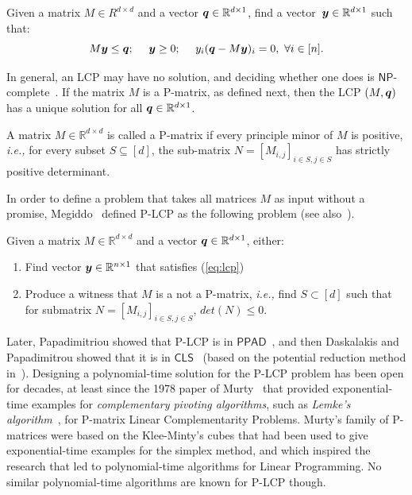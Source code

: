 \documentclass[a4paper,UKenglish]{lipics2}
\theoremstyle{definition}
\def\cc#1{\mathsf{#1}}
\def\CLS{\ensuremath{\cc{CLS}}\xspace}
\def\NP{\ensuremath{\cc{NP}}\xspace}
\def\PPAD{\ensuremath{\cc{PPAD}}\xspace}
\def\problem#1{\textsc{#1}}
\def\PLCP{\problem{P-LCP}\xspace}
\def\Real{\mathbb{R}}
\newcommand{\yy}{\mbox{\boldmath $y$}}
\newcommand{\qq}{\mbox{\boldmath $q$}}
\begin{document}
\begin{definition}[LCP]
\label{def:lcp}
Given a matrix $M \in R^{d \times d}$ and a vector $\qq\in \Real^{d\times 1}$,
find a vector~{$\yy\in \Real^{d \times 1}$} such that:
\begin{equation}\label{eq:lcp}
M\yy\le \qq;\ \ \ \ \yy\ge 0;\ \ \ \ y_i(\qq - M\yy)_i =0,\ \forall i \in [n].
\end{equation}
\end{definition}
%
In general, an LCP may have no solution, and deciding whether one does is
\NP-complete~\cite{chung1989np}. If the matrix $M$ is a P-matrix, as defined
next, then the LCP $(M,\qq)$ has a unique solution for all $\qq\in \Real^{d\times
1}$.
%
\begin{definition}[P-matrix]
\label{def:Pmatrix}
A matrix $M \in \Real^{d \times d}$ is called a P-matrix if every principle
minor of $M$ is positive, {\em i.e.,} for every subset $S\subseteq[d]$, the
sub-matrix $N=[M_{i,j}]_{i\in S, j\in S}$ has strictly positive determinant. 
\end{definition}
%
In order to define a problem that takes all matrices $M$ as input without 
a promise, Megiddo~\cite{megiddo1988note} defined \PLCP as the following problem
(see also~\cite{megiddo1991total}).
%
\begin{definition}[\PLCP] \label{def:plcp} Given a matrix $M\in \Real^{d\times
d}$ and a vector $\qq\in \Real^{d\times 1}$, either:
\begin{enumerate}[label=(Q\arabic*)] \item Find vector $\yy \in \Real^{n
			\times 1}$ that satisfies (\ref{eq:lcp}) \item Produce a witness
that $M$ is a not a P-matrix, {\em i.e.,} find $S\subset [d]$ such that for
submatrix $N=[M_{i,j}]_{i\in S, j\in S}$, $det(N)\le 0$.  \end{enumerate}
\end{definition}
%
Later, Papadimitriou showed that \PLCP is in
\PPAD~\cite{papadimitriou1994complexity}, and then Daskalakis and Papadimitrou
showed that it is in \CLS~\cite{daskalakis2011continuous} (based on the
potential reduction method in~\cite{kojima1992interior}).  Designing a
polynomial-time solution for the \PLCP problem has been open for decades, at
least since the 1978 paper of Murty~\cite{murty1978computational} that provided
exponential-time examples for \emph{complementary pivoting algorithms}, such as 
\emph{Lemke's algorithm}~\cite{lemke1965bimatrix}, for
P-matrix Linear Complementarity Problems. Murty's family of P-matrices were
based on the Klee-Minty's cubes that had been used to give exponential-time
examples for the simplex method, and which inspired the research that led to
polynomial-time algorithms for Linear Programming. No similar polynomial-time
algorithms are known for \PLCP though.
\end{document}
